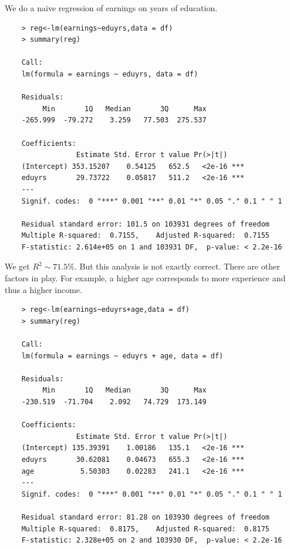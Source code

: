 \documentclass[notoc]{tufte-book}
\begin{document}
We do a naive regression of earnings on years of education.
\begin{lstlisting}
    > reg<-lm(earnings~eduyrs,data = df)
    > summary(reg)
    
    Call:
    lm(formula = earnings ~ eduyrs, data = df)
    
    Residuals:
         Min       1Q   Median       3Q      Max 
    -265.999  -79.272    3.259   77.503  275.537 
    
    Coefficients:
                 Estimate Std. Error t value Pr(>|t|)    
    (Intercept) 353.15207    0.54125   652.5   <2e-16 ***
    eduyrs       29.73722    0.05817   511.2   <2e-16 ***
    ---
    Signif. codes:  0 "***" 0.001 "**" 0.01 "*" 0.05 "." 0.1 " " 1
    
    Residual standard error: 101.5 on 103931 degrees of freedom
    Multiple R-squared:  0.7155,	Adjusted R-squared:  0.7155 
    F-statistic: 2.614e+05 on 1 and 103931 DF,  p-value: < 2.2e-16 
\end{lstlisting}
We get  $R^2\sim 71.5\%$. But this analysis is not exactly correct. There are other factors in play. For example, a higher age corresponds to more experience and thus a higher income.
\begin{lstlisting}
    > reg<-lm(earnings~eduyrs+age,data = df)
    > summary(reg)
    
    Call:
    lm(formula = earnings ~ eduyrs + age, data = df)
    
    Residuals:
         Min       1Q   Median       3Q      Max 
    -230.519  -71.704    2.092   74.729  173.149 
    
    Coefficients:
                 Estimate Std. Error t value Pr(>|t|)    
    (Intercept) 135.39391    1.00186   135.1   <2e-16 ***
    eduyrs       30.62081    0.04673   655.3   <2e-16 ***
    age           5.50303    0.02283   241.1   <2e-16 ***
    ---
    Signif. codes:  0 "***" 0.001 "**" 0.01 "*" 0.05 "." 0.1 " " 1
    
    Residual standard error: 81.28 on 103930 degrees of freedom
    Multiple R-squared:  0.8175,	Adjusted R-squared:  0.8175 
    F-statistic: 2.328e+05 on 2 and 103930 DF,  p-value: < 2.2e-16
\end{lstlisting}
\end{document}
